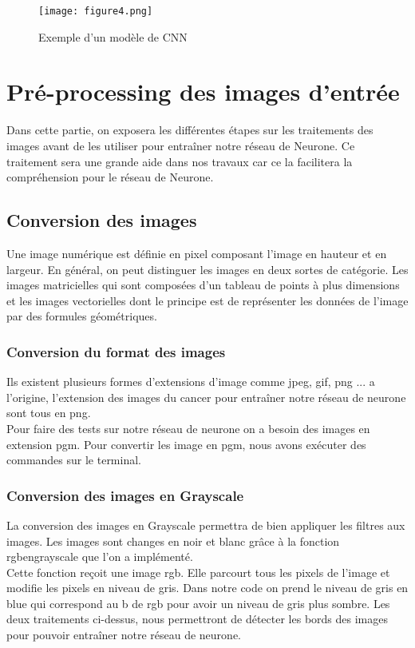 \documentclass[a4paper,11pt]{report}
\begin{document}
\begin{figure}[!htbp]
\begin{center}
\texttt{[image: figure4.png]}
\caption{Exemple d'un modèle de CNN}
\end{center}
\end{figure}




\chapter{Pré-processing des images d'entrée}
Dans cette partie, on exposera les différentes étapes sur les traitements des images avant de les utiliser pour entraîner notre réseau de Neurone. Ce traitement sera une grande aide dans nos travaux car ce la facilitera la compréhension pour le réseau de Neurone.


\section{Conversion des images}
Une image numérique est définie en pixel composant l'image en hauteur et en largeur. En général, on peut distinguer les images en deux sortes de catégorie. Les images matricielles qui sont composées d'un tableau de points à plus dimensions et les images vectorielles dont le principe est de représenter les données de l'image par des formules géométriques.

\subsection{Conversion du format des images}
Ils existent plusieurs formes
d'extensions d'image comme jpeg, gif, png ... a l'origine, l'extension des images du cancer pour entraîner notre réseau de neurone sont tous en png.\\
Pour faire des tests sur notre réseau de neurone on a besoin des images en extension pgm. Pour convertir les image en pgm, nous avons exécuter des commandes sur le terminal.

\subsection{Conversion des images en Grayscale}
La conversion des images
en Grayscale permettra de bien appliquer les filtres aux images. Les images
sont changes en noir et blanc grâce à la fonction rgbengrayscale que l'on
a implémenté. \\
Cette fonction reçoit une image rgb. Elle parcourt tous
les pixels de l'image et modifie les pixels en niveau de gris.
Dans notre
code on prend le niveau de gris en blue qui correspond au b de rgb pour
avoir un niveau de gris plus sombre. Les deux traitements ci-dessus, nous
permettront de détecter les bords des images pour pouvoir entraîner notre
réseau de neurone.
\end{document}
